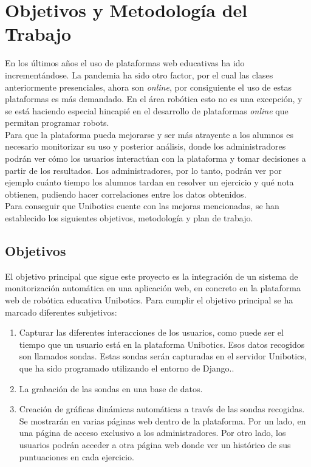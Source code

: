 \chapter{Objetivos y Metodología del Trabajo}\label{objetivos}

En los últimos años el uso de plataformas web educativas ha ido incrementándose. La pandemia ha sido otro factor, por el cual las clases anteriormente presenciales, ahora son \textit{online}, por consiguiente el uso de estas plataformas es más demandado. En el área robótica esto no es una excepción, y se está haciendo especial hincapié en el desarrollo de plataformas \textit{online} que permitan programar robots.\\

Para que la plataforma pueda mejorarse y ser más atrayente a los alumnos es necesario monitorizar su uso y posterior análisis, donde los administradores podrán ver cómo los usuarios interactúan con la plataforma y tomar decisiones a partir de los resultados. Los administradores, por lo tanto, podrán ver por ejemplo cuánto tiempo los alumnos tardan en resolver un ejercicio y qué nota obtienen, pudiendo hacer correlaciones entre los datos obtenidos.\\

Para conseguir que Unibotics cuente con las mejoras mencionadas, se han establecido los siguientes objetivos, metodología y plan de trabajo.


\section{Objetivos}

El objetivo principal que sigue este proyecto es la integración de un sistema de monitorización automática en una aplicación web,
en concreto en la plataforma web de robótica educativa
Unibotics. Para cumplir el objetivo principal se ha marcado diferentes subjetivos:\\

\begin{enumerate}
\item Capturar las diferentes interacciones de los usuarios, como puede ser el tiempo que un usuario está en la plataforma Unibotics. Esos datos recogidos son llamados sondas. Estas sondas serán capturadas en el servidor Unibotics, que ha sido programado utilizando el entorno de Django..
\item La grabación de las sondas en una base de datos.
\item Creación de gráficas dinámicas automáticas a través de las sondas recogidas. Se mostrarán en varias páginas web dentro de la plataforma. Por un lado, en una página de acceso exclusivo a los administradores. Por otro lado, los usuarios podrán acceder a otra página web donde ver un histórico de sus puntuaciones en cada ejercicio.
\end{enumerate}


